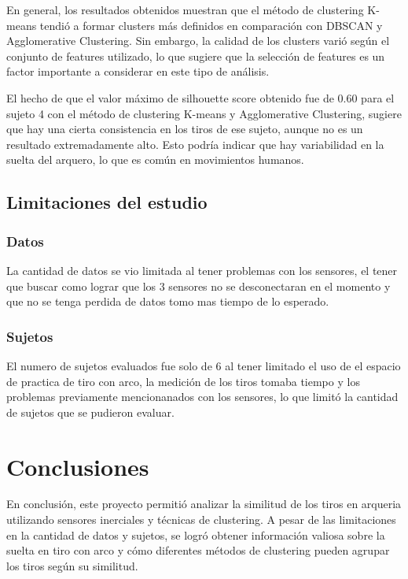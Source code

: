 \documentclass[11pt,a4paper,twocolumn,twoside]{rho-class/rho}
\begin{document}
        En general, los resultados obtenidos muestran que el método de clustering K-means tendió a formar clusters más definidos en comparación con DBSCAN y Agglomerative Clustering. Sin embargo, la calidad de los clusters varió según el conjunto de features utilizado, lo que sugiere que la selección de features es un factor importante a considerar en este tipo de análisis.

        El hecho de que el valor máximo de silhouette score obtenido fue de 0.60 para el sujeto 4 con el método de clustering K-means y Agglomerative Clustering, sugiere que hay una cierta consistencia en los tiros de ese sujeto, aunque no es un resultado extremadamente alto. Esto podría indicar que hay variabilidad en la suelta del arquero, lo que es común en movimientos humanos.

    \subsection{Limitaciones del estudio}

        \subsubsection{Datos}

            La cantidad de datos se vio limitada al tener problemas con los sensores, el tener que buscar como lograr que los 3 sensores no se desconectaran en el momento y que no se tenga perdida de datos tomo mas tiempo de lo esperado.

        \subsubsection{Sujetos}

            El numero de sujetos evaluados fue solo de 6 al tener limitado el uso de el espacio de practica de tiro con arco, la medición de los tiros tomaba tiempo y los problemas previamente mencionanados con los sensores, lo que limitó la cantidad de sujetos que se pudieron evaluar.

\section{Conclusiones}

    En conclusión, este proyecto permitió analizar la similitud de los tiros en arqueria utilizando sensores inerciales y técnicas de clustering. A pesar de las limitaciones en la cantidad de datos y sujetos, se logró obtener información valiosa sobre la suelta en tiro con arco y cómo diferentes métodos de clustering pueden agrupar los tiros según su similitud. 
\end{document}
